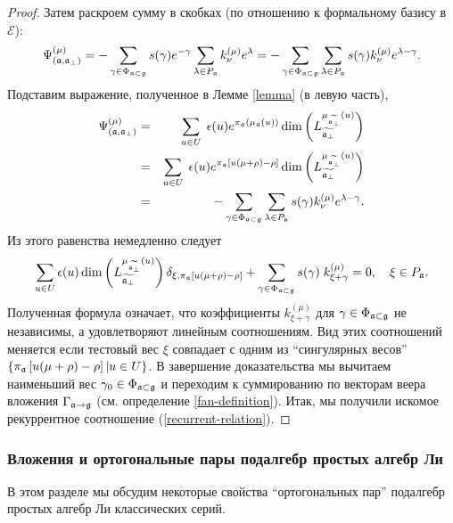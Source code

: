 \begin{proof}
Затем раскроем сумму в скобках (по отношению к формальному базису в  $\mathcal{E}$):
\begin{equation*}
\Psi ^{\left( \mu \right) }_{\left(  \af, \afb \right)}
=-\sum_{\gamma \in \Phi _{\af\subset \gf}}s(\gamma
)e^{-\gamma }\sum_{\lambda \in P_{\af}}k_{\nu }^{(\mu )}e^{\lambda
}=-\sum_{\gamma \in \Phi _{\af\subset \gf}}\sum_{\lambda \in P_{%
\af}}s(\gamma )k_{\nu }^{(\mu )}e^{\lambda -\gamma }.
\end{equation*}
Подставим выражение, полученное в Лемме \ref{lemma} (в левую часть),
\begin{eqnarray*}
\Psi ^{\left( \mu \right) }_{\left(  \af, \afb \right)}
&=&\sum_{u\in U}\;\epsilon (u)e^{\pi _{\af}\left( \mu _{\frak{a%
}}\left( u\right) \right) }\dim \left( L_{\widetilde{\af_{\perp }}%
}^{\mu _{\widetilde{\af_{\perp }}}\left( u\right) }\right)
\label{anom modules 2} \\
&=&\sum_{u\in U}\;\epsilon (u)e^{\pi _{\af}\left[ u(\mu +\rho )-\rho %
\right] }\dim \left( L_{\widetilde{\af_{\perp }}}^{\mu _{\widetilde{%
\af_{\perp }}}\left( u\right) }\right)  \\
&=&-\sum_{\gamma \in \Phi _{\af\subset \gf}}\sum_{\lambda \in P_{%
\af}}s(\gamma )k_{\nu }^{(\mu )}e^{\lambda -\gamma }.
\end{eqnarray*}
Из этого равенства немедленно следует
\begin{equation}
\sum_{u\in U}\epsilon (u)\dim \left( L_{\widetilde{\af_{\perp }}}^{\mu
_{\widetilde{\af_{\perp }}}\left( u\right) }\right) \delta _{\xi ,\pi _{%
\af}\left[ u(\mu +\rho )-\rho \right] }+\sum_{\gamma \in \Phi _{\af%
\subset \gf}}s(\gamma )\;k_{\xi +\gamma }^{(\mu )}=0,\quad \xi \in P_{%
\af}.  \label{eq:17}
\end{equation}
Полученная формула означает, что коэффициенты  $k_{\xi +\gamma }^{(\mu )}$ для  $\gamma \in \Phi _{\mathfrak{a}\subset \mathfrak{g}}$ не независимы, а удовлетворяют линейным соотношениям. Вид этих соотношений меняется если тестовый вес  $\xi $ совпадает с одним из ``сингулярных весов''   $\left\{ \pi _{\mathfrak{a}}\left[ u(\mu +\rho )-\rho \right] |u\in U\right\} $. В завершение доказательства мы вычитаем наименьший вес  $\gamma _{0}\in \Phi _{\mathfrak{a}\subset \mathfrak{g}}$ и переходим к суммированию по векторам веера вложения $\Gamma _{\mathfrak{a}\rightarrow \mathfrak{g}}$ (см. определение \ref{fan-definition}). Итак, мы получили искомое рекуррентное соотношение  (\ref{recurrent-relation}).
\end{proof}

\subsubsection{Вложения и ортогональные пары подалгебр простых алгебр Ли}
\label{sect-embeddings}
В этом разделе мы обсудим некоторые свойства ``ортогональных пар'' подалгебр простых алгебр Ли классических серий. 

